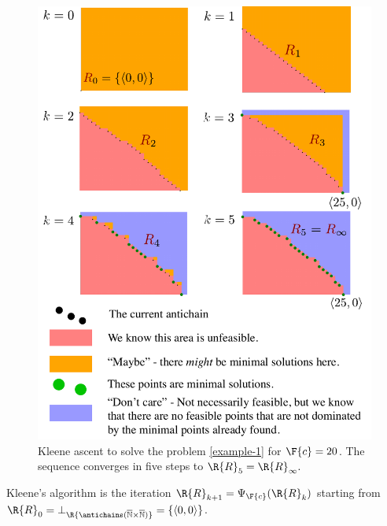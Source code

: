 \begin{figure}
\begin{centering}
\includegraphics[bb=0bp 0bp 458bp 621bp,clip,scale=0.5]{papers/arxiv_submission_v6/gmcdptro_example20.pdf}
\par\end{centering}
\caption{\label{fig:example24}Kleene ascent to solve the problem \eqref{example-1}
for $\F{c}=20$. The sequence converges in five steps to $\R{R}_{5}=\R{R}_{\infty}.$ }
\end{figure}

\noindent Kleene's algorithm is the iteration $\R{R}_{k+1}=\Psi_{\F{c}}(\R{R}_{k})$
starting from $\R{R}_{0}=\bot_{\R{\antichains(\overline{\mathbb{N}}\times\overline{\mathbb{N}})}}=\{\left\langle 0,0\right\rangle \}$.

